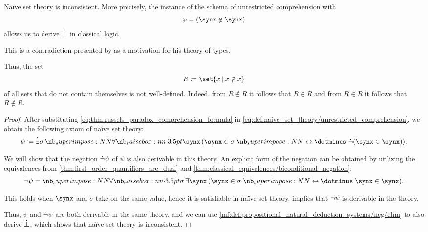 \begin{theorem}\label{thm:russels_paradox}
  \hyperref[def:naive_set_theory]{Na\"ive set theory} is \hyperref[def:first_order_theory/consistent]{inconsistent}. More precisely, the instance of the \hyperref[def:naive_set_theory/unrestricted_comprehension]{schema of unrestricted comprehension} with
  \begin{equation}\label{eq:thm:russels_paradox_comprehension_formula}
    \varphi = (\synx \not\in \synx)
  \end{equation}
  allows us to derive \( \dot{\bot} \) in \hyperref[con:classical_logic]{classical logic}.
\end{theorem}
\begin{comments}
  \item This is a contradiction presented by  as a motivation for his theory of types.
\end{comments}
\begin{comments}
  \item Thus, the set
  \begin{equation}\label{eq:thm:russels_paradox_set}
    R \coloneqq \set{ x \given x \not\in x }
  \end{equation}
  of all sets that do not contain themselves is not well-defined. Indeed, from \( R \not\in R \) it follows that \( R \in R \) and from \( R \in R \) it follows that \( R \not\in R \).
\end{comments}
\begin{proof}
  After substituting \eqref{eq:thm:russels_paradox_comprehension_formula} in \eqref{eq:def:naive_set_theory/unrestricted_comprehension}, we obtain the following axiom of na\"ive set theory:
  \begin{equation}\label{eq:thm:russels_paradox_comprehension_axiom}
    \psi \coloneqq \qexists \sigma \qforall \synx (\synx \in \sigma \syniff \synneg (\synx \in \synx)).
  \end{equation}

  We will show that the negation \( \dot{\neg}\psi \) of \( \psi \) is also derivable in this theory. An explicit form of the negation can be obtained by utilizing the equivalences from \cref{thm:first_order_quantifiers_are_dual} and \cref{thm:classical_equivalences/biconditional_negation}:
  \begin{equation*}
    \synneg\psi = \qforall \sigma \qexists \synx (\synx \in \sigma \syniff \synx \in \synx).
  \end{equation*}

  This holds when \( \synx \) and \( \sigma \) take on the same value, hence it is satisfiable in na\"ive set theory.  implies that \( \dot{\neg}\psi \) is derivable in the theory.

  Thus, \( \psi \) and \( \dot{\neg}\psi \) are both derivable in the same theory, and we can use \ref{inf:def:propositional_natural_deduction_systems/neg/elim} to also derive \( \dot{\bot} \), which shows that na\"ive set theory is inconsistent.
\end{proof}

